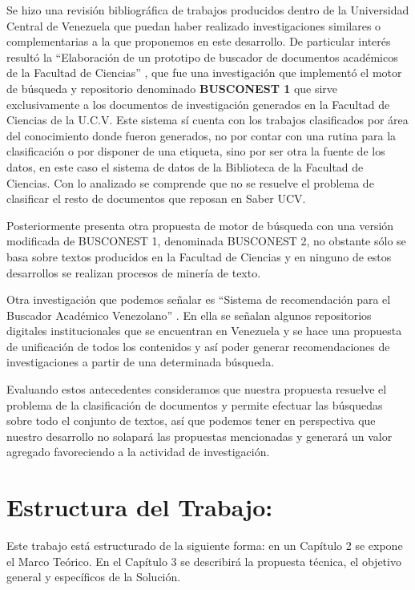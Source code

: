 \documentclass[
  10,
  spanish,
  openany]{book}
\begin{document}
Se hizo una revisión bibliográfica de trabajos producidos dentro de la Universidad Central de Venezuela que puedan haber realizado investigaciones similares o complementarias a la que proponemos en este desarrollo. De particular interés resultó la ``Elaboración de un prototipo de buscador de documentos académicos de la Facultad de Ciencias'' \citep{Sánchez2008}, que fue una investigación que implementó el motor de búsqueda y repositorio denominado \textbf{BUSCONEST 1} que sirve exclusivamente a los documentos de investigación generados en la Facultad de Ciencias de la U.C.V. Este sistema sí cuenta con los trabajos clasificados por área del conocimiento donde fueron generados, no por contar con una rutina para la clasificación o por disponer de una etiqueta, sino por ser otra la fuente de los datos, en este caso el sistema de datos de la Biblioteca de la Facultad de Ciencias. Con lo analizado se comprende que no se resuelve el problema de clasificar el resto de documentos que reposan en Saber UCV.

Posteriormente \citep{guevara2015} presenta otra propuesta de motor de búsqueda con una versión modificada de BUSCONEST 1, denominada BUSCONEST 2, no obstante sólo se basa sobre textos producidos en la Facultad de Ciencias y en ninguno de estos desarrollos se realizan procesos de minería de texto.

Otra investigación que podemos señalar es ``Sistema de recomendación para el Buscador Académico Venezolano'' \citep{rodríguezlaguna2016}. En ella se señalan algunos repositorios digitales institucionales que se encuentran en Venezuela y se hace una propuesta de unificación de todos los contenidos y así poder generar recomendaciones de investigaciones a partir de una determinada búsqueda.

Evaluando estos antecedentes consideramos que nuestra propuesta resuelve el problema de la clasificación de documentos y permite efectuar las búsquedas sobre todo el conjunto de textos, así que podemos tener en perspectiva que nuestro desarrollo no solapará las propuestas mencionadas y generará un valor agregado favoreciendo a la actividad de investigación.

\hypertarget{estructura}{%
\section{Estructura del Trabajo:}\label{estructura}}

Este trabajo está estructurado de la siguiente forma: en un Capítulo 2 se expone el Marco Teórico. En el Capítulo 3 se describirá la propuesta técnica, el objetivo general y específicos de la Solución.
\end{document}
